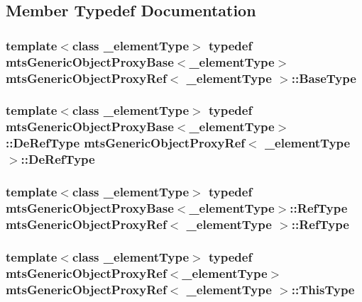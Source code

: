 \subsection{Member Typedef Documentation}
\hypertarget{classmts_generic_object_proxy_ref_a52a477c15ddc935700cf9fdbe9da0dcf}{
\subsubsection[{Base\-Type}]{\setlength{\rightskip}{0pt plus 5cm}template$<$class \-\_\-element\-Type$>$ typedef {\bf mts\-Generic\-Object\-Proxy\-Base}$<$\-\_\-element\-Type$>$ {\bf mts\-Generic\-Object\-Proxy\-Ref}$<$ \-\_\-element\-Type $>$\-::{\bf Base\-Type}}}\label{classmts_generic_object_proxy_ref_a52a477c15ddc935700cf9fdbe9da0dcf}
\hypertarget{classmts_generic_object_proxy_ref_af6b06c46f460ed5aca8fbe05ab6bde61}{
\subsubsection[{De\-Ref\-Type}]{\setlength{\rightskip}{0pt plus 5cm}template$<$class \-\_\-element\-Type$>$ typedef {\bf mts\-Generic\-Object\-Proxy\-Base}$<$\-\_\-element\-Type$>$\-::{\bf De\-Ref\-Type} {\bf mts\-Generic\-Object\-Proxy\-Ref}$<$ \-\_\-element\-Type $>$\-::{\bf De\-Ref\-Type}}}\label{classmts_generic_object_proxy_ref_af6b06c46f460ed5aca8fbe05ab6bde61}
\hypertarget{classmts_generic_object_proxy_ref_a2b4ed89cb2db6ed1dd47d1352ada6be8}{
\subsubsection[{Ref\-Type}]{\setlength{\rightskip}{0pt plus 5cm}template$<$class \-\_\-element\-Type$>$ typedef {\bf mts\-Generic\-Object\-Proxy\-Base}$<$\-\_\-element\-Type$>$\-::{\bf Ref\-Type} {\bf mts\-Generic\-Object\-Proxy\-Ref}$<$ \-\_\-element\-Type $>$\-::{\bf Ref\-Type}}}\label{classmts_generic_object_proxy_ref_a2b4ed89cb2db6ed1dd47d1352ada6be8}
\hypertarget{classmts_generic_object_proxy_ref_a02e3c6255922d05f1fc627ee67dd3bd9}{
\subsubsection[{This\-Type}]{\setlength{\rightskip}{0pt plus 5cm}template$<$class \-\_\-element\-Type$>$ typedef {\bf mts\-Generic\-Object\-Proxy\-Ref}$<$\-\_\-element\-Type$>$ {\bf mts\-Generic\-Object\-Proxy\-Ref}$<$ \-\_\-element\-Type $>$\-::{\bf This\-Type}}}\label{classmts_generic_object_proxy_ref_a02e3c6255922d05f1fc627ee67dd3bd9}
